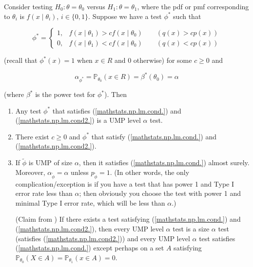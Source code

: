 \begin{lemma}\label{mathstats.np.lem}



Consider testing \(H_0: \theta = \theta_0\) versus \(H_1: \theta = \theta_1\), where the pdf or pmf corresponding to \(\theta_i\) is \(f(x \mid \theta_i)\), \(i \in \{0,1\}\). Suppose we have a test \(\phi^*\) such that 

\begin{equation}\label{mathstats.np.lm.cond.}
\phi^* = \begin{cases}
1, & f(x \mid \theta_1) > c f(x \mid \theta_0) \qquad (q(x) > c p(x)) \\
0, & f(x \mid \theta_1) < c f(x \mid \theta_0)  \qquad (q(x) < c p(x))
\end{cases}
\end{equation}

(recall that \(\phi^*(x) = 1\) when \(x \in R\) and 0 otherwise) for some \(c \geq 0\) and 

\begin{equation}\label{mathstats.np.lm.cond2.}
\alpha_{\phi^*} = \mathbb{P}_{\theta_0}(x \in R) = \beta^*(\theta_0) = \alpha
\end{equation}

(where \(\beta^*\) is the power test for \(\phi^*\)). Then

\begin{enumerate}

\item Any test \(\phi^*\) that satisfies (\ref{mathstats.np.lm.cond.}) and (\ref{mathstats.np.lm.cond2.}) is a UMP level \(\alpha\) test.

\item

There exist \(c \geq 0\) and \(\phi^*\) that satisfy (\ref{mathstats.np.lm.cond.}) and (\ref{mathstats.np.lm.cond2.}).

\item

If \(\tilde{\phi}\) is UMP of size \(\alpha\), then it satisfies (\ref{mathstats.np.lm.cond.}) almost surely. Moreover, \(\alpha_{\tilde{\phi}} = \alpha\) unless \(p_{\tilde{\phi}} = 1\). (In other words, the only complication/exception is if you have a test that has power 1 and Type I error rate less than \(\alpha\); then obviously you choose the test with power 1 and minimal Type I error rate, which will be less than \(\alpha\).)

(Claim from \citet{CaseBerg:01}) If there exists a test satisfying (\ref{mathstats.np.lm.cond.}) and (\ref{mathstats.np.lm.cond2.}), then every UMP level \(\alpha\) test is a size \(\alpha\) test (satisfies (\ref{mathstats.np.lm.cond2.})) and every UMP level \(\alpha\) test satisfies (\ref{mathstats.np.lm.cond.}) except perhaps on a set \(A\) satisfying \(\mathbb{P}_{\theta_0}(X \in A) = \mathbb{P}_{\theta_1} (x \in A) = 0\).

\end{enumerate}

\end{lemma}


